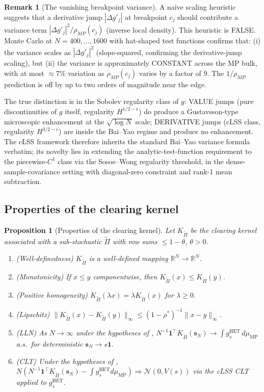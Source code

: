 \documentclass[11pt,a4paper]{article}
\newtheorem{proposition}[theorem]{Proposition}
\theoremstyle{definition}
\newtheorem{remark}[theorem]{Remark}
\newcommand{\rhoStar}{\rho^\ast}
\newcommand{\muMP}{\mu_{\mathrm{MP}}}
\newcommand{\Kcal}{K_{\widetilde{\Pi}}}
\newcommand{\HET}{\mathrm{HET}}
\begin{document}
\begin{remark}[The vanishing breakpoint variance]
\label{rmk:no-Vbreak}
A naive scaling heuristic suggests that a derivative jump $|\Delta g'_j|$
at breakpoint $c_j$ should contribute a variance term
$|\Delta g'_j|^2/\rho_{MP}(c_j)$ (inverse local density). This heuristic is
FALSE. Monte Carlo at $N = 400,\ldots,1600$ with hat-shaped test functions
confirms that: (i) the variance scales as $|\Delta g'_j|^2$ (slope-squared,
confirming the derivative-jump scaling), but (ii) the variance is
approximately CONSTANT across the MP bulk, with at most $\approx 7\%$
variation as $\rho_{MP}(c_j)$ varies by a factor of 9. The $1/\rho_{MP}$
prediction is off by up to two orders of magnitude near the edge.

The true distinction is in the Sobolev regularity class of $g$: VALUE jumps
(pure discontinuities of $g$ itself, regularity $H^{1/2-\epsilon}$) do
produce a Gustavsson-type microscopic enhancement at the $\sqrt{\log N}$
scale; DERIVATIVE jumps (cLSS class, regularity $H^{3/2-\epsilon}$) are
inside the Bai--Yao regime and produce no enhancement. The cLSS framework
therefore inherits the standard Bai--Yao variance formula verbatim; its
novelty lies in extending the analytic-test-function requirement to the
piecewise-$C^1$ class via the Sosoe--Wong regularity threshold, in the
dense-sample-covariance setting with diagonal-zero constraint and rank-1
mean subtraction.
\end{remark}

\subsection{Properties of the clearing kernel}

\begin{proposition}[Properties of the clearing kernel]
\label{prop:kernel}
Let $\Kcal$ be the clearing kernel associated with a sub-stochastic
$\widetilde\Pi$ with row sums $\leq 1-\theta$, $\theta>0$.
\begin{enumerate}[label={\rm(K\arabic*)},leftmargin=2em]
\item {\rm(Well-definedness)} $\Kcal$ is a well-defined mapping
   $\mathbb{R}^N\to\mathbb{R}^N$.
\item {\rm(Monotonicity)} If $x\leq y$ componentwise, then $\Kcal(x)\leq\Kcal(y)$.
\item {\rm(Positive homogeneity)} $\Kcal(\lambda x) = \lambda\Kcal(x)$ for
   $\lambda\geq 0$.
\item {\rm(Lipschitz)} $\|\Kcal(x) - \Kcal(y)\|_\infty\leq(1-\rhoStar)^{-1}\|x-y\|_\infty$.
\item {\rm(LLN)} As $N\to\infty$ under the hypotheses of ,
   $N^{-1}\mathbf{1}^\top\Kcal(\mathbf{s}_N)\to\int g_s^{\HET}\,d\muMP$
   a.s.\ for deterministic $\mathbf{s}_N\to s\mathbf{1}$.
\item {\rm(CLT)} Under the hypotheses of ,
   $N(N^{-1}\mathbf{1}^\top\Kcal(\mathbf{s}_N) - \int g_s^{\HET}d\muMP)\Rightarrow\mathcal N(0,V(s))$
   via the cLSS CLT applied to $g_s^{\HET}$.
\end{enumerate}
\end{proposition}
\end{document}
